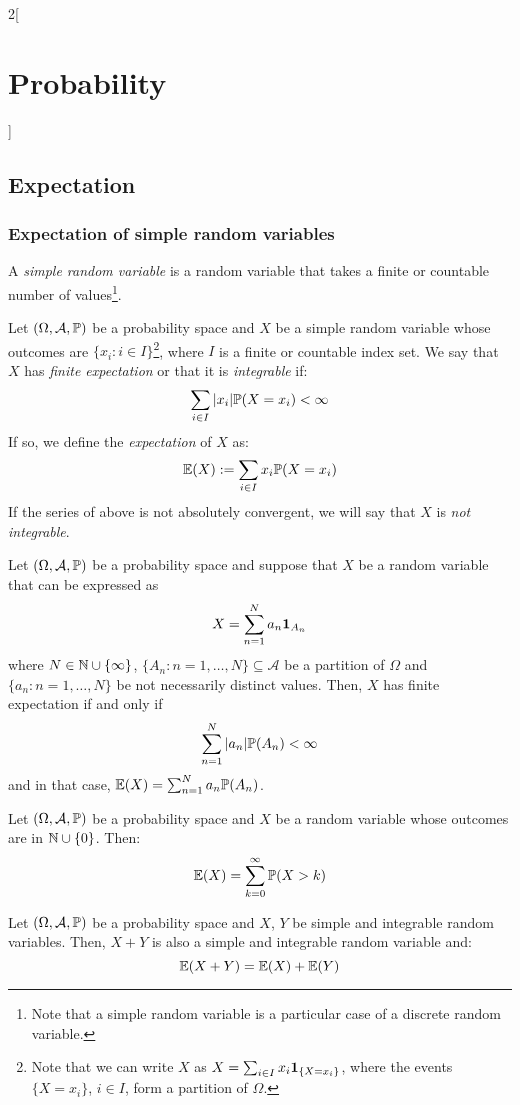 \documentclass[../../../main.tex]{subfiles}
\begin{document}
\begin{multicols}{2}[\section{Probability}]
    \subsection{Expectation}\label{P_exp}
    \subsubsection{Expectation of simple random variables}
    \begin{definition}
        A \textit{simple random variable} is a random variable that takes a finite or countable number of values\footnote{Note that a simple random variable is a particular case of a discrete random variable.}.
    \end{definition}
    \begin{definition}
        Let $(\Omega,\mathcal{A},\mathbb{P})$ be a probability space and $X$ be a simple random variable whose outcomes are $\{x_i:i\in I\}$\footnote{Note that we can write $X$ as $X=\sum_{i\in I}x_i\boldsymbol{\mathrm{1}}_{\{X=x_i\}}$, where the events $\{X=x_i\}$, $i\in I$, form a partition of $\Omega$.}, where $I$ is a finite or countable index set. We say that $X$ has \textit{finite expectation} or that it is \textit{integrable} if: $$\sum_{i\in I}|x_i|\mathbb{P}(X=x_i)<\infty$$
        If so, we define the \textit{expectation} of $X$ as: $$\mathbb{E}(X):=\sum_{i\in I}x_i\mathbb{P}(X=x_i)$$ If the series of above is not absolutely convergent, we will say that $X$ is \textit{not integrable}.
    \end{definition}
    \begin{lemma}
        Let $(\Omega,\mathcal{A},\mathbb{P})$ be a probability space and suppose that $X$ be a random variable that can be expressed as $$X=\sum_{n=1}^Na_n\boldsymbol{\mathrm{1}}_{A_n}$$ where $N\in\mathbb{N}\cup\{\infty\}$, $\{A_n:n=1,\ldots,N\}\subseteq\mathcal{A}$ be a partition of $\Omega$ and $\{a_n:n=1,\ldots,N\}$ be not necessarily distinct values. Then, $X$ has finite expectation if and only if $$\sum_{n=1}^N|a_n|\mathbb{P}(A_n)<\infty$$ and in that case, $\mathbb{E}(X)=\sum_{n=1}^Na_n\mathbb{P}(A_n)$.
    \end{lemma}
    \begin{prop}
        Let $(\Omega,\mathcal{A},\mathbb{P})$ be a probability space and $X$ be a random variable whose outcomes are in $\mathbb{N}\cup\{0\}$. Then: $$\mathbb{E}(X)=\sum_{k=0}^\infty\mathbb{P}(X>k)$$
    \end{prop}
    \begin{prop}
        Let $(\Omega,\mathcal{A},\mathbb{P})$ be a probability space and $X$, $Y$ be simple and integrable random variables. Then, $X+Y$ is also a simple and integrable random variable and: $$\mathbb{E}(X+Y)=\mathbb{E}(X)+\mathbb{E}(Y)$$

\end{prop}
\end{multicols}
\end{document}
